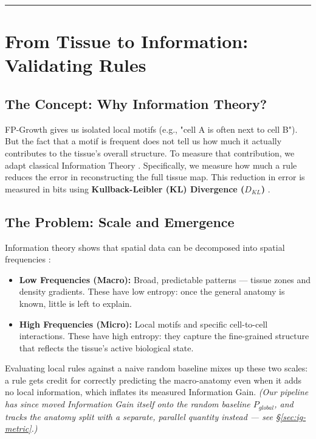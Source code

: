 \documentclass[10pt, a4paper]{article}
\begin{document}
\vspace{0.5cm}
\hrule
\section{From Tissue to Information: Validating Rules}

\subsection{The Concept: Why Information Theory?}
FP-Growth gives us isolated local motifs (e.g., "cell A is often next to cell B"). But the fact that a motif is frequent does not tell us how much it actually contributes to the tissue's overall structure. To measure that contribution, we adapt classical Information Theory \cite{Schumacher2015}. Specifically, we measure how much a rule reduces the error in reconstructing the full tissue map. This reduction in error is measured in bits using \textbf{Kullback-Leibler (KL) Divergence ($D_{KL}$)} \cite[Lecture 5, pp. 76-78]{Schumacher2015}.

\subsection{The Problem: Scale and Emergence}
\label{subsec:scale-problem}
Information theory shows that spatial data can be decomposed into spatial frequencies \cite[Lecture 6, pp. 106-108]{Schumacher2015}:
\begin{itemize}
    \item \textbf{Low Frequencies (Macro):} Broad, predictable patterns — tissue zones and density gradients. These have low entropy: once the general anatomy is known, little is left to explain.
    \item \textbf{High Frequencies (Micro):} Local motifs and specific cell-to-cell interactions. These have high entropy: they capture the fine-grained structure that reflects the tissue's active biological state.
\end{itemize}

Evaluating local rules against a naive random baseline mixes up these two scales: a rule gets credit for correctly predicting the macro-anatomy even when it adds no local information, which inflates its measured Information Gain. \textit{(Our pipeline has since moved Information Gain itself onto the random baseline $P_{global}$, and tracks the anatomy split with a separate, parallel quantity instead --- see \S\ref{sec:ig-metric}.)}
\end{document}
